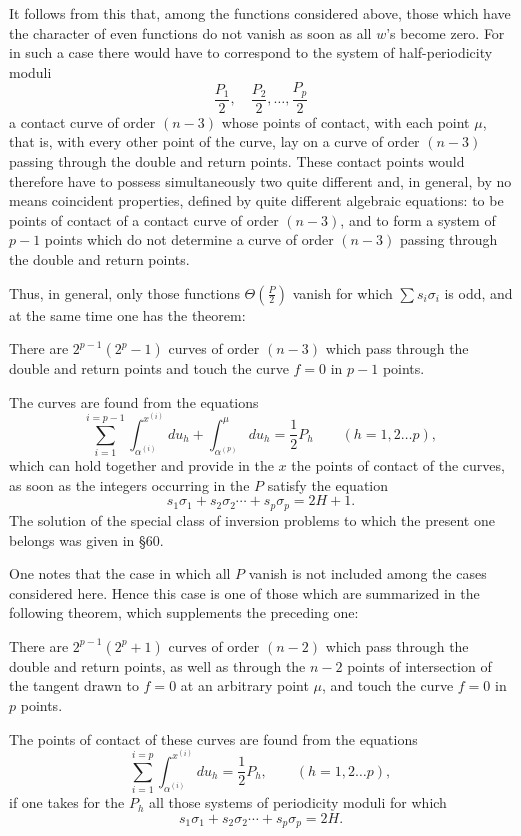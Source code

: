 \documentclass[10pt]{article}
\begin{document}
It follows from this that, among the functions considered above, those which have the character of even functions do not vanish as soon as all \(w\)'s become zero. For in such a case there would have to correspond to the system of half-periodicity moduli
\[
\frac{P_1}{2},\quad \frac{P_2}{2},\ldots,\frac{P_p}{2}
\]
a contact curve of order \((n-3)\) whose points of contact, with each point \(\mu\), that is, with every other point of the curve, lay on a curve of order \((n-3)\) passing through the double and return points. These contact points would therefore have to possess simultaneously two quite different and, in general, by no means coincident properties, defined by quite different algebraic equations: to be points of contact of a contact curve of order \((n-3)\), and to form a system of \(p-1\) points which do not determine a curve of order \((n-3)\) passing through the double and return points.

Thus, in general, only those functions \(\Theta\left(\frac P2\right)\) vanish for which \(\sum s_i\sigma_i\) is odd, and at the same time one has the theorem:

There are \(2^{p-1}(2^p-1)\) curves of order \((n-3)\) which pass through the double and return points and touch the curve \(f=0\) in \(p-1\) points.

The curves are found from the equations
\[
\sum_{i=1}^{i=p-1}\int_{\alpha^{(i)}}^{x^{(i)}}du_h
+\int_{\alpha^{(p)}}^{\mu}du_h
=\frac12P_h
\qquad (h=1,2\ldots p),
\]
which can hold together and provide in the \(x\) the points of contact of the curves, as soon as the integers occurring in the \(P\) satisfy the equation
\[
s_1\sigma_1+s_2\sigma_2\cdots+s_p\sigma_p=2H+1.
\]
The solution of the special class of inversion problems to which the present one belongs was given in §60.

One notes that the case in which all \(P\) vanish is not included among the cases considered here. Hence this case is one of those which are summarized in the following theorem, which supplements the preceding one:

There are \(2^{p-1}(2^p+1)\) curves of order \((n-2)\) which pass through the double and return points, as well as through the \(n-2\) points of intersection of the tangent drawn to \(f=0\) at an arbitrary point \(\mu\), and touch the curve \(f=0\) in \(p\) points.

The points of contact of these curves are found from the equations
\[
\sum_{i=1}^{i=p}\int_{\alpha^{(i)}}^{x^{(i)}}du_h=\frac12P_h,
\qquad (h=1,2\ldots p),
\]
if one takes for the \(P_h\) all those systems of periodicity moduli for which
\[
s_1\sigma_1+s_2\sigma_2\cdots+s_p\sigma_p=2H.
\]
\end{document}
